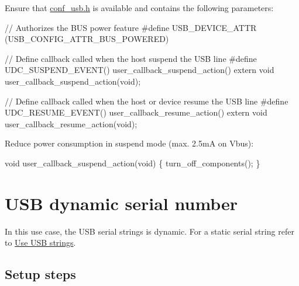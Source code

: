 \begin{DoxyEnumerate}
\item Ensure that \hyperlink{conf__usb_8h}{conf\-\_\-usb.\-h} is available and contains the following parameters\-:
\begin{DoxyItemize}
\item 
\begin{DoxyCode}
 \textcolor{comment}{// Authorizes the BUS power feature}
\textcolor{preprocessor}{        #define  USB\_DEVICE\_ATTR (USB\_CONFIG\_ATTR\_BUS\_POWERED) }
\end{DoxyCode}

\item 
\begin{DoxyCode}
 \textcolor{comment}{// Define callback called when the host suspend the USB line}
\textcolor{preprocessor}{        #define UDC\_SUSPEND\_EVENT() user\_callback\_suspend\_action()}
\textcolor{preprocessor}{        extern void user\_callback\_suspend\_action(void); }
\end{DoxyCode}

\item 
\begin{DoxyCode}
 \textcolor{comment}{// Define callback called when the host or device resume the USB line}
\textcolor{preprocessor}{        #define UDC\_RESUME\_EVENT() user\_callback\_resume\_action()}
\textcolor{preprocessor}{        extern void user\_callback\_resume\_action(void); }
\end{DoxyCode}

\end{DoxyItemize}
\item Reduce power consumption in suspend mode (max. 2.\-5m\-A on Vbus)\-:
\begin{DoxyItemize}
\item 
\begin{DoxyCode}
 \textcolor{keywordtype}{void} user\_callback\_suspend\_action(\textcolor{keywordtype}{void})
        \{
        turn\_off\_components();
        \} 
\end{DoxyCode}
 
\end{DoxyItemize}
\end{DoxyEnumerate}\hypertarget{udc_use_case_6}{}\section{U\-S\-B dynamic serial number}\label{udc_use_case_6}
In this use case, the U\-S\-B serial strings is dynamic. For a static serial string refer to \hyperlink{udc_use_case_2}{Use U\-S\-B strings}.\hypertarget{udc_use_case_6_udc_use_case_6_setup}{}\subsection{Setup steps}\label{udc_use_case_6_udc_use_case_6_setup}
